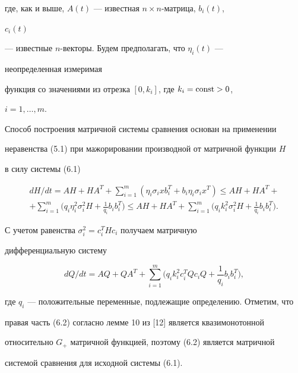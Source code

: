 где, как и выше, $A(t)$ --- известная $n\times n$-матрица, $b_i(t)$, 


$c_i(t)$ 


--- известные $n$-векторы. Будем предполагать, что $\eta_i(t)$ --- 


неопределенная измеримая 


функция со значениями из отрезка $[0,k_i]$, где $k_i=\operatorname{const}>0$, 


$i=1,\dotsc,m$. 


 


Способ построения матричной системы сравнения основан на применении 


неравенства (5.1) при мажорировании производной от матричной функции $H$ 


в силу системы (6.1)


\begin{multline*} 


d H/d t=A H+H A^T+\sum^m_{i=1}(\eta_i\sigma_i x b^T_i+ 


b_i\eta_i\sigma_i x^T)\le A H+H A^T+ \\ 


% 


+\sum^m_{i=1}\bigg(q_i\eta^2_i\sigma^2_i H+\frac{1}{q_i} 


b_i b^T_i\bigg)\le A H+H A^T+\sum^m_{i=1}\bigg(q_i k^2_i 


\sigma^2_i H+\frac{1}{q_i}b_i b^T_i\bigg). 


\end{multline*} 


С учетом равенства $\sigma^2_i=c^T_i H c_i$ получаем матричную 


дифференциальную систему 


\begin{equation} 


d Q/d t=A Q+Q A^T+\sum^m_{i=1}\bigg(q_i k^2_i c^T_i Q c_i Q+ 


\frac{1}{q_i}b_i b^T_i\bigg), 


\end{equation} 


где $q_i$ --- положительные переменные, подлежащие определению. Отметим, что 


правая часть (6.2) согласно лемме 10 из [12] является квазимонотонной 


относительно $G_+$ матричной функцией, поэтому (6.2) является матричной 


системой сравнения для исходной системы (6.1). 


